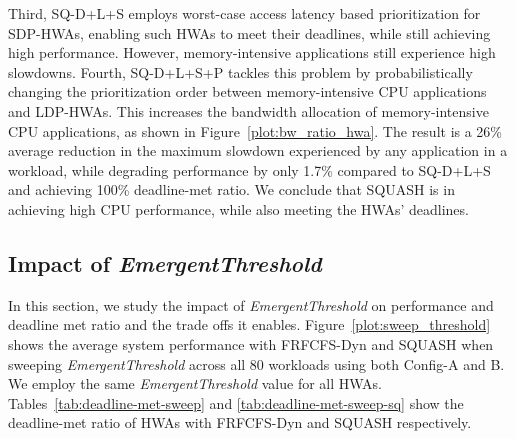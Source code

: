 \documentclass[10pt,letterpaper]{article}
\newcommand{\TMP}[1]{#1}
\newcommand{\ldphwas}[0]{LDP-HWAs\xspace}
\newcommand{\sdphwas}[0]{SDP-HWAs\xspace}
\begin{document}
Third, SQ-D+L+S employs worst-case access latency based prioritization
for \sdphwas, enabling such HWAs to meet their deadlines, while still achieving
high performance. However, memory-intensive applications still experience high
slowdowns. Fourth, SQ-D+L+S+P tackles this problem by probabilistically
changing the prioritization order between memory-intensive CPU applications and
\ldphwas. This increases the bandwidth allocation of memory-intensive CPU
applications, as shown in Figure~\ref{plot:bw_ratio_hwa}. The result is a 26\% average reduction in the maximum slowdown experienced by any application in a workload,
while degrading performance by only 1.7\% compared to SQ-D+L+S and achieving
100\% deadline-met ratio. We conclude that SQUASH is in achieving high CPU
performance, while also meeting the HWAs' deadlines.





\subsection{Impact of \emph{EmergentThreshold}}\label{sec:sweeping_th}

In this section, we study the impact of {\it EmergentThreshold} on
performance and deadline met ratio and the trade offs it enables.
Figure~\ref{plot:sweep_threshold} shows the average system
performance with FRFCFS-Dyn and SQUASH when sweeping {\it
EmergentThreshold} across all 80 workloads using both Config-A and
B. We employ the same {\it EmergentThreshold} value for all HWAs.
\TMP{Tables~\ref{tab:deadline-met-sweep} and
\ref{tab:deadline-met-sweep-sq} show the deadline-met ratio of
HWAs with FRFCFS-Dyn and SQUASH respectively. }
\end{document}

